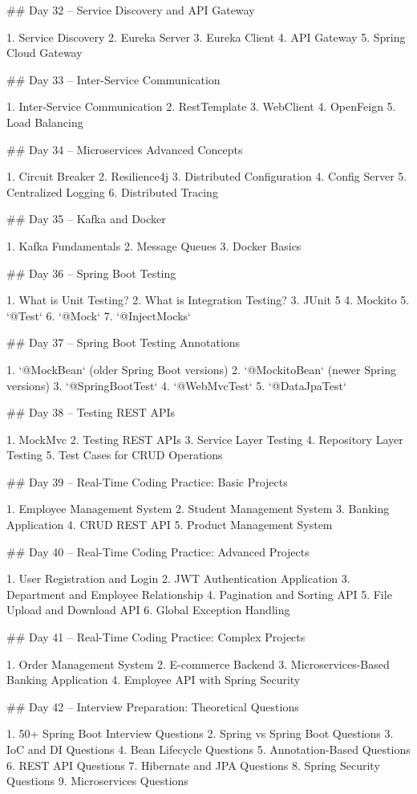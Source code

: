 ## Day 32 – Service Discovery and API Gateway

1. Service Discovery
2. Eureka Server
3. Eureka Client
4. API Gateway
5. Spring Cloud Gateway

## Day 33 – Inter-Service Communication

1. Inter-Service Communication
2. RestTemplate
3. WebClient
4. OpenFeign
5. Load Balancing

## Day 34 – Microservices Advanced Concepts

1. Circuit Breaker
2. Resilience4j
3. Distributed Configuration
4. Config Server
5. Centralized Logging
6. Distributed Tracing

## Day 35 – Kafka and Docker

1. Kafka Fundamentals
2. Message Queues
3. Docker Basics

## Day 36 – Spring Boot Testing

1. What is Unit Testing?
2. What is Integration Testing?
3. JUnit 5
4. Mockito
5. `@Test`
6. `@Mock`
7. `@InjectMocks`

## Day 37 – Spring Boot Testing Annotations

1. `@MockBean` (older Spring Boot versions)
2. `@MockitoBean` (newer Spring versions)
3. `@SpringBootTest`
4. `@WebMvcTest`
5. `@DataJpaTest`

## Day 38 – Testing REST APIs

1. MockMvc
2. Testing REST APIs
3. Service Layer Testing
4. Repository Layer Testing
5. Test Cases for CRUD Operations

## Day 39 – Real-Time Coding Practice: Basic Projects

1. Employee Management System
2. Student Management System
3. Banking Application
4. CRUD REST API
5. Product Management System

## Day 40 – Real-Time Coding Practice: Advanced Projects

1. User Registration and Login
2. JWT Authentication Application
3. Department and Employee Relationship
4. Pagination and Sorting API
5. File Upload and Download API
6. Global Exception Handling

## Day 41 – Real-Time Coding Practice: Complex Projects

1. Order Management System
2. E-commerce Backend
3. Microservices-Based Banking Application
4. Employee API with Spring Security

## Day 42 – Interview Preparation: Theoretical Questions

1. 50+ Spring Boot Interview Questions
2. Spring vs Spring Boot Questions
3. IoC and DI Questions
4. Bean Lifecycle Questions
5. Annotation-Based Questions
6. REST API Questions
7. Hibernate and JPA Questions
8. Spring Security Questions
9. Microservices Questions

